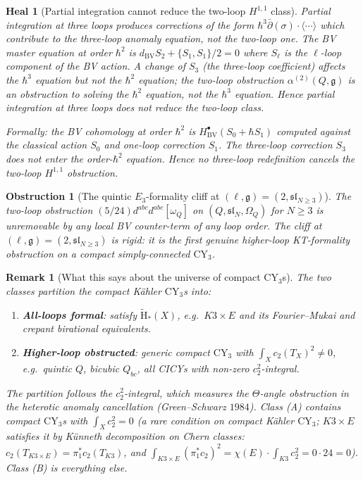\documentclass[11pt]{article}
\newtheorem{remark}[theorem]{Remark}
\newtheorem{heal}[theorem]{Heal}
\newtheorem{obstruction}[theorem]{Obstruction}
\providecommand{\CY}{\mathrm{CY}}
\providecommand{\Om}{\Omega}
\providecommand{\fg}{\mathfrak{g}}
\begin{document}
\begin{heal}[Partial integration cannot reduce the two-loop
$H^{1,1}$ class]
\label{heal:partial-integration-fails}
Partial integration at three loops produces corrections of the
form $\hbar^3 \bar\partial (\sigma) \cdot \langle \cdots\rangle$
which contribute to the three-loop anomaly equation, not the
two-loop one.  The BV master equation at order $\hbar^2$ is
$d_{\mathrm{BV}} S_2 + \{S_1, S_1\}/2 = 0$ where $S_\ell$ is the
$\ell$-loop component of the BV action.  A change of $S_3$ (the
three-loop coefficient) affects the $\hbar^3$ equation but not the
$\hbar^2$ equation;  the two-loop obstruction $\alpha^{(2)}(Q,\fg)$
is an obstruction to solving the $\hbar^2$ equation, not the
$\hbar^3$ equation.  Hence partial integration at three loops does
not reduce the two-loop class.

Formally: the BV cohomology at order $\hbar^2$ is
$H^\bullet_{\mathrm{BV}}(S_0 + \hbar S_1)$ computed against the
classical action $S_0$ and one-loop correction $S_1$.  The
three-loop correction $S_3$ does not enter the order-$\hbar^2$
equation.  Hence no three-loop redefinition cancels the two-loop
$H^{1,1}$ obstruction.
\end{heal}

\begin{obstruction}[The quintic $E_3$-formality cliff at $(\ell,
\fg) = (2, \mathfrak{sl}_{N\geq 3})$]
\label{obs:quintic-cliff}
\ClaimStatusTheorem
The two-loop obstruction $(5/24) d^{abc} d^{abc} [\omega_Q]$ on
$(Q, \mathfrak{sl}_N, \Om_Q)$ for $N \geq 3$ is unremovable by any
local BV counter-term of any loop order.  The cliff at
$(\ell, \fg) = (2, \mathfrak{sl}_{N \geq 3})$ is rigid: it is the
first genuine higher-loop KT-formality obstruction on a compact
simply-connected $\CY_3$.
\end{obstruction}

\begin{remark}[What this says about the universe of compact
$\CY_3$s]
\label{rem:universe-of-cy3s}
The two classes partition the compact K\"ahler $\CY_3$s into:
\begin{enumerate}[label=(\Alph*)]
\item \textbf{All-loops formal}: satisfy $\widetilde{\mathrm{H}}_*(X)$,
e.g.\ $K3 \times E$ and its Fourier--Mukai and crepant birational
equivalents.
\item \textbf{Higher-loop obstructed}: generic compact $\CY_3$
with $\int_X c_2(T_X)^2 \neq 0$, e.g.\ quintic $Q$, bicubic
$Q_{bc}$, all CICYs with non-zero $c_2^2$-integral.
\end{enumerate}
The partition follows the $c_2^2$-integral, which measures the
$\Theta$-angle obstruction in the heterotic anomaly cancellation
(Green--Schwarz $1984$).  Class (A) contains compact $\CY_3$s with
$\int_X c_2^2 = 0$ (a rare condition on compact K\"ahler $\CY_3$;
$K3 \times E$ satisfies it by K\"unneth decomposition on Chern
classes: $c_2(T_{K3 \times E}) = \pi_1^* c_2(T_{K3})$, and
$\int_{K3\times E} (\pi_1^* c_2)^2 = \chi(E) \cdot \int_{K3} c_2^2 =
0 \cdot 24 = 0$).  Class (B) is everything else.
\end{remark}
\end{document}

